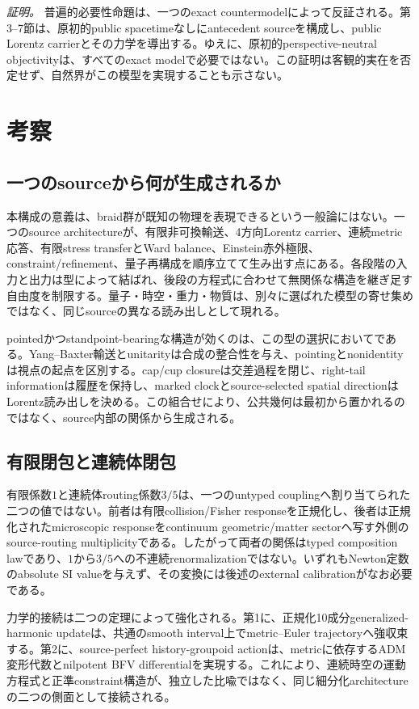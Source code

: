 \documentclass[11pt]{article}
\theoremstyle{definition}
\theoremstyle{remark}
\begin{document}
\textit{証明。} 普遍的必要性命題は、一つのexact countermodelによって反証される。第3--7節は、原初的public spacetimeなしにantecedent sourceを構成し、public Lorentz carrierとその力学を導出する。ゆえに、原初的perspective-neutral objectivityは、すべてのexact modelで必要ではない。この証明は客観的実在を否定せず、自然界がこの模型を実現することも示さない。

\section{考察}

\subsection{一つのsourceから何が生成されるか}

本構成の意義は、braid群が既知の物理を表現できるという一般論にはない。一つのsource architectureが、有限非可換輸送、4方向Lorentz carrier、連続metric応答、有限stress transferとWard balance、Einstein赤外極限、constraint/refinement、量子再構成を順序立てて生み出す点にある。各段階の入力と出力は型によって結ばれ、後段の方程式に合わせて無関係な構造を継ぎ足す自由度を制限する。量子・時空・重力・物質は、別々に選ばれた模型の寄せ集めではなく、同じsourceの異なる読み出しとして現れる。

pointedかつstandpoint-bearingな構造が効くのは、この型の選択においてである。Yang--Baxter輸送とunitarityは合成の整合性を与え、pointingとnonidentityは視点の起点を区別する。cap/cup closureは交差過程を閉じ、right-tail informationは履歴を保持し、marked clockとsource-selected spatial directionはLorentz読み出しを決める。この組合せにより、公共幾何は最初から置かれるのではなく、source内部の関係から生成される。

\subsection{有限閉包と連続体閉包}

有限係数$1$と連続体routing係数$3/5$は、一つのuntyped couplingへ割り当てられた二つの値ではない。前者は有限collision/Fisher responseを正規化し、後者は正規化されたmicroscopic responseをcontinuum geometric/matter sectorへ写す外側のsource-routing multiplicityである。したがって両者の関係はtyped composition lawであり、$1$から$3/5$への不連続renormalizationではない。いずれもNewton定数のabsolute SI valueを与えず、その変換には後述のexternal calibrationがなお必要である。

力学的接続は二つの定理によって強化される。第1に、正規化10成分generalized-harmonic updateは、共通のsmooth interval上でmetric--Euler trajectoryへ強収束する。第2に、source-perfect history-groupoid actionは、metricに依存するADM変形代数とnilpotent BFV differentialを実現する。これにより、連続時空の運動方程式と正準constraint構造が、独立した比喩ではなく、同じ細分化architectureの二つの側面として接続される。
\end{document}
